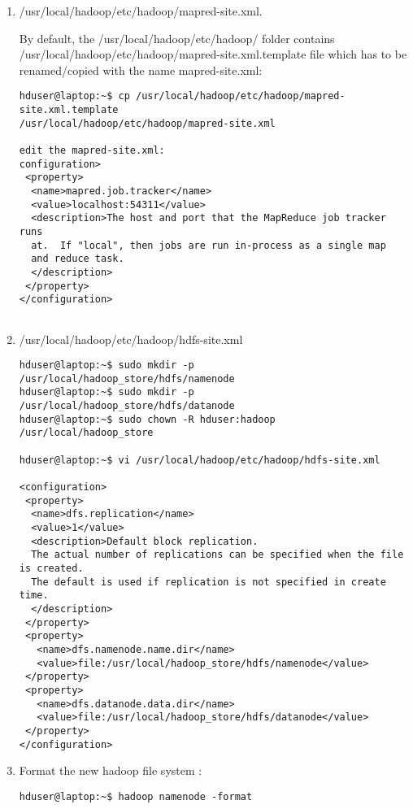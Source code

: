 \documentclass[11pt]{article}
\begin{document}
\begin{enumerate}
\begin{verbatim}
\end{verbatim}\vspace{-.15in}


\item /usr/local/hadoop/etc/hadoop/mapred-site.xml.

By default, the /usr/local/hadoop/etc/hadoop/ folder contains
/usr/local/hadoop/etc/hadoop/mapred-site.xml.template
file which has to be renamed/copied with the name mapred-site.xml:
\vspace{-.15in}\begin{verbatim}
hduser@laptop:~$ cp /usr/local/hadoop/etc/hadoop/mapred-site.xml.template 
/usr/local/hadoop/etc/hadoop/mapred-site.xml

edit the mapred-site.xml:
configuration>
 <property>
  <name>mapred.job.tracker</name>
  <value>localhost:54311</value>
  <description>The host and port that the MapReduce job tracker runs
  at.  If "local", then jobs are run in-process as a single map
  and reduce task.
  </description>
 </property>
</configuration>


\end{verbatim}\vspace{-.15in}


\item /usr/local/hadoop/etc/hadoop/hdfs-site.xml
\vspace{-.15in}\begin{verbatim}
hduser@laptop:~$ sudo mkdir -p /usr/local/hadoop_store/hdfs/namenode
hduser@laptop:~$ sudo mkdir -p /usr/local/hadoop_store/hdfs/datanode
hduser@laptop:~$ sudo chown -R hduser:hadoop /usr/local/hadoop_store

hduser@laptop:~$ vi /usr/local/hadoop/etc/hadoop/hdfs-site.xml

<configuration>
 <property>
  <name>dfs.replication</name>
  <value>1</value>
  <description>Default block replication.
  The actual number of replications can be specified when the file is created.
  The default is used if replication is not specified in create time.
  </description>
 </property>
 <property>
   <name>dfs.namenode.name.dir</name>
   <value>file:/usr/local/hadoop_store/hdfs/namenode</value>
 </property>
 <property>
   <name>dfs.datanode.data.dir</name>
   <value>file:/usr/local/hadoop_store/hdfs/datanode</value>
 </property>
</configuration>

\end{verbatim}\vspace{-.15in}

\item Format the new hadoop file system : 
\vspace{-.15in}\begin{verbatim}
hduser@laptop:~$ hadoop namenode -format
\end{verbatim}\vspace{-.15in}


\end{enumerate}
\end{document}
